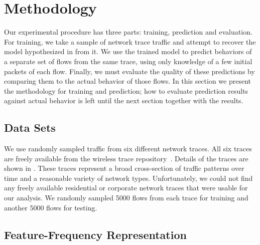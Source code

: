 \documentclass[conference]{IEEEtran}
\begin{document}
\section{Methodology}

Our experimental procedure has three parts:
training, prediction and evaluation.
For training, we take a sample of network trace traffic and attempt to recover the model hypothesized in  from it.
We use the trained model to predict behaviors of a separate set of flows from the same trace, using only knowledge of a few initial packets of each flow.
Finally, we must evaluate the quality of these predictions by comparing them to the actual behavior of those flows.
In this section we present the methodology for training and prediction;
how to evaluate prediction results against actual behavior is left until the next section together with the results.

\subsection{Data Sets}

We use randomly sampled traffic from six different network traces.
All six traces are freely available from the  wireless trace repository~\cite{Yeo06}.
Details of the traces are shown in .
These traces represent a broad cross-section of traffic patterns over time and a reasonable variety of network types.
Unfortunately, we could not find any freely available residential or corporate network traces that were usable for our analysis.
We randomly sampled 5000 flows from each trace for training and another 5000 flows for testing.

\subsection{Feature-Frequency Representation}
\end{document}

